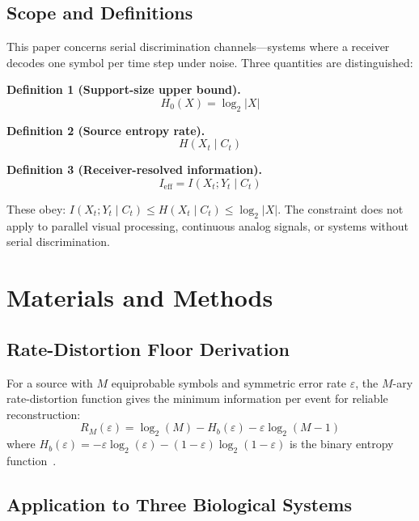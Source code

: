 \documentclass[11pt]{article}
\begin{document}
\subsection{Scope and Definitions}

This paper concerns serial discrimination channels---systems where a receiver decodes one symbol per time step under noise. Three quantities are distinguished:

\textbf{Definition 1 (Support-size upper bound).}
\begin{equation}
    H_0(X) = \log_2 |X|
\end{equation}

\textbf{Definition 2 (Source entropy rate).}
\begin{equation}
    H(X_t \mid C_t)
\end{equation}

\textbf{Definition 3 (Receiver-resolved information).}
\begin{equation}
    I_{\mathrm{eff}} = I(X_t; Y_t \mid C_t)
\end{equation}

These obey: $I(X_t; Y_t \mid C_t) \leq H(X_t \mid C_t) \leq \log_2 |X|$. The constraint does not apply to parallel visual processing, continuous analog signals, or systems without serial discrimination.

\section{Materials and Methods}

\subsection{Rate-Distortion Floor Derivation}

For a source with $M$ equiprobable symbols and symmetric error rate $\varepsilon$, the $M$-ary rate-distortion function gives the minimum information per event for reliable reconstruction:
\begin{equation}
    R_M(\varepsilon) = \log_2(M) - H_b(\varepsilon) - \varepsilon \log_2(M - 1)
\end{equation}
where $H_b(\varepsilon) = -\varepsilon \log_2(\varepsilon) - (1 - \varepsilon) \log_2(1 - \varepsilon)$ is the binary entropy function~\cite{shannon1948}.

\subsection{Application to Three Biological Systems}
\end{document}
